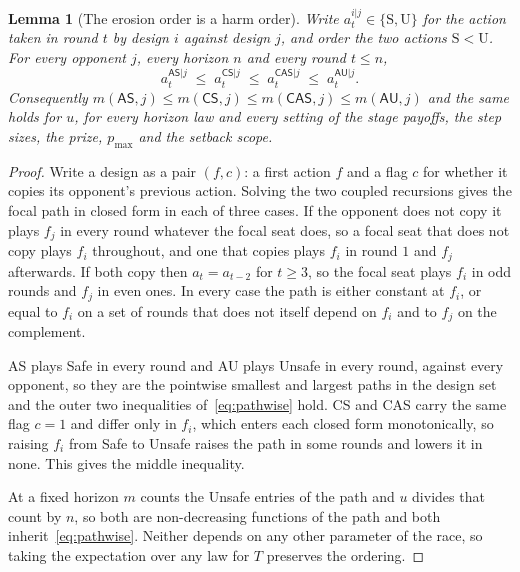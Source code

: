 \documentclass[11pt,a4paper]{article}
\newtheorem{lemma}[theorem]{Lemma}
\theoremstyle{definition}
\newcommand{\AS}{\textsf{AS}}
\newcommand{\CS}{\textsf{CS}}
\newcommand{\CAS}{\textsf{CAS}}
\newcommand{\AU}{\textsf{AU}}
\begin{document}
\begin{lemma}[The erosion order is a harm order]
\label{lem:order}
Write $a^{i|j}_{t}\in\{\mathrm{S},\mathrm{U}\}$ for the action taken in round
$t$ by design $i$ against design $j$, and order the two actions
$\mathrm{S}<\mathrm{U}$. For every opponent $j$, every horizon $n$ and every
round $t\le n$,
\begin{equation}
  a^{\AS{}|j}_{t}\;\le\;a^{\CS{}|j}_{t}\;\le\;a^{\CAS{}|j}_{t}
  \;\le\;a^{\AU{}|j}_{t}.
  \label{eq:pathwise}
\end{equation}
Consequently $m(\AS{},j)\le m(\CS{},j)\le m(\CAS{},j)\le m(\AU{},j)$ and the
same holds for $u$, for every horizon law and every setting of the stage
payoffs, the step sizes, the prize, $p_{\max}$ and the setback scope.
\end{lemma}

\begin{proof}
Write a design as a pair $(f,c)$: a first action $f$ and a flag $c$ for whether
it copies its opponent's previous action. Solving the two coupled recursions
gives the focal path in closed form in each of three cases. If the opponent
does not copy it plays $f_{j}$ in every round whatever the focal seat does, so
a focal seat that does not copy plays $f_{i}$ throughout, and one that copies
plays $f_{i}$ in round $1$ and $f_{j}$ afterwards. If both copy then
$a_{t}=a_{t-2}$ for $t\ge3$, so the focal seat plays $f_{i}$ in odd rounds and
$f_{j}$ in even ones. In every case the path is either constant at $f_{i}$, or
equal to $f_{i}$ on a set of rounds that does not itself depend on $f_{i}$ and
to $f_{j}$ on the complement.

\AS{} plays Safe in every round and \AU{} plays Unsafe in every round, against
every opponent, so they are the pointwise smallest and largest paths in the
design set and the outer two inequalities of~\eqref{eq:pathwise} hold. \CS{}
and \CAS{} carry the same flag $c=1$ and differ only in $f_{i}$, which enters
each closed form monotonically, so raising $f_{i}$ from Safe to Unsafe raises
the path in some rounds and lowers it in none. This gives the middle
inequality.

At a fixed horizon $m$ counts the Unsafe entries of the path and $u$ divides
that count by $n$, so both are non-decreasing functions of the path and both
inherit~\eqref{eq:pathwise}. Neither depends on any other parameter of the
race, so taking the expectation over any law for $T$ preserves the ordering.
\end{proof}
\end{document}
